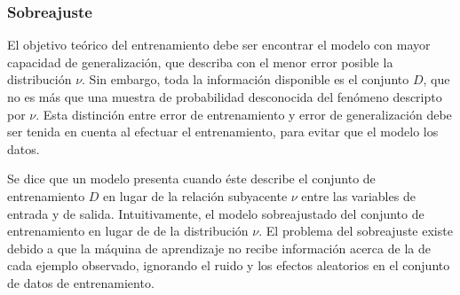 %
\subsubsection{Sobreajuste}
%
El objetivo teórico del entrenamiento debe ser
encontrar el modelo con mayor capacidad de generalización, que
describa con el menor error posible la distribución $\nu$.
Sin embargo, toda la información disponible es el conjunto $D$, que no
es más que una muestra de probabilidad desconocida del fenómeno
descripto por $\nu$.
Esta distinción entre error de entrenamiento y
error de generalización debe ser tenida en cuenta al efectuar el
entrenamiento, para evitar que el modelo  los datos.

Se dice que un modelo presenta  cuando éste describe
el conjunto de entrenamiento $D$ en lugar de la relación
subyacente $\nu$ entre las variables de entrada y de salida.
Intuitivamente, el modelo sobreajustado
 del conjunto de entrenamiento en lugar de
 de la distribución $\nu$.
El problema del sobreajuste existe debido a que la máquina de
aprendizaje no recibe información acerca de la 
de cada ejemplo observado, ignorando el ruido y los efectos
aleatorios en el conjunto de datos de entrenamiento.
